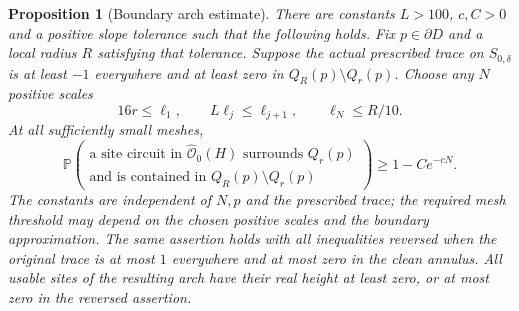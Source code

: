 \documentclass[11pt]{article}
\newcommand{\Prob}{\mathbb P}
\newtheorem{proposition}[theorem]{Proposition}
\theoremstyle{definition}
\theoremstyle{remark}
\numberwithin{equation}{section}
\begin{document}
\begin{samepage}
\begin{proposition}[Boundary arch estimate]\label{prop:boundary-arch}
There are constants $L>100$, $c,C>0$ and a positive slope tolerance
such that the following holds.  Fix $p\in\partial D$ and a local
radius $R$ satisfying that tolerance.  Suppose the actual prescribed
trace on $S_{0,\delta}$ is at least $-1$ everywhere and at least zero
in $Q_R(p)\setminus Q_r(p)$.  Choose any $N$ positive scales
\[
 16r\le\ell_1,\qquad
 L\ell_j\le\ell_{j+1},\qquad
 \ell_N\le R/10.
\]
At all sufficiently small meshes,
\begin{equation}
 \Prob\!\left(
 \begin{array}{c}
 \text{a site circuit in }\widehat{\mathcal O}_0(H)
 \text{ surrounds }Q_r(p)\\[-2pt]
 \text{and is contained in }Q_R(p)\setminus Q_r(p)
 \end{array}\right)
 \ge 1-Ce^{-cN}.
 \label{boundary:arch-estimate}
\end{equation}
The constants are independent of $N,p$ and the prescribed trace;
the required mesh threshold may depend on the chosen positive
scales and the boundary approximation.  The same assertion holds
with all inequalities reversed when the original trace is at most
$1$ everywhere and at most zero in the clean annulus.  All usable
sites of the resulting arch have their real height at least zero,
or at most zero in the reversed assertion.
\end{proposition}
\end{samepage}
\end{document}
